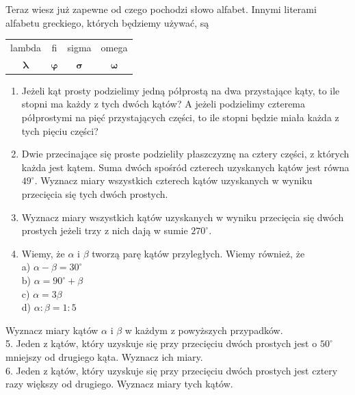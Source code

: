 \documentclass[10pt]{article}
\begin{document}
Teraz wiesz już zapewne od czego pochodzi słowo alfabet. Innymi literami alfabetu greckiego, których będziemy używać, są

\begin{center}
\begin{tabular}{cccc}
lambda & fi & sigma & omega \\
\(\boldsymbol{\lambda}\) & \(\boldsymbol{\varphi}\) & \(\boldsymbol{\sigma}\) & \(\boldsymbol{\omega}\) \\
\end{tabular}
\end{center}

\begin{enumerate}
  \item Jeżeli kąt prosty podzielimy jedną półprostą na dwa przystające kąty, to ile stopni ma każdy z tych dwóch kątów? A jeżeli podzielimy czterema półprostymi na pięć przystających części, to ile stopni będzie miała każda z tych pięciu części?
  \item Dwie przecinające się proste podzieliły płaszczyznę na cztery części, z których każda jest kątem. Suma dwóch spośród czterech uzyskanych kątów jest równa \(49^{\circ}\). Wyznacz miary wszystkich czterech kątów uzyskanych w wyniku przecięcia się tych dwóch prostych.
  \item Wyznacz miary wszystkich kątów uzyskanych w wyniku przecięcia się dwóch prostych jeżeli trzy z nich dają w sumie \(270^{\circ}\).
  \item Wiemy, że \(\alpha\) i \(\beta\) tworzą parę kątów przyległych. Wiemy również, że\\
a) \(\alpha-\beta=30^{\circ}\)\\
b) \(\alpha=90^{\circ}+\beta\)\\
c) \(\alpha=3 \beta\)\\
d) \(\alpha: \beta=1: 5\)
\end{enumerate}

Wyznacz miary kątów \(\alpha\) i \(\beta\) w każdym z powyższych przypadków.\\
5. Jeden z kątów, który uzyskuje się przy przecięciu dwóch prostych jest o \(50^{\circ}\) mniejszy od drugiego kąta. Wyznacz ich miary.\\
6. Jeden z kątów, który uzyskuje się przy przecięciu dwóch prostych jest cztery razy większy od drugiego. Wyznacz miary tych kątów.
\end{document}
